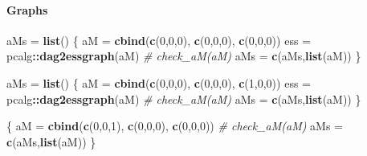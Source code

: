 \documentclass[]{article}
\newenvironment{Shaded}{\begin{snugshade}}{\end{snugshade}}
\newcommand{\KeywordTok}[1]{\textcolor[rgb]{0.13,0.29,0.53}{\textbf{#1}}}
\newcommand{\DecValTok}[1]{\textcolor[rgb]{0.00,0.00,0.81}{#1}}
\newcommand{\StringTok}[1]{\textcolor[rgb]{0.31,0.60,0.02}{#1}}
\newcommand{\CommentTok}[1]{\textcolor[rgb]{0.56,0.35,0.01}{\textit{#1}}}
\newcommand{\OperatorTok}[1]{\textcolor[rgb]{0.81,0.36,0.00}{\textbf{#1}}}
\newcommand{\NormalTok}[1]{#1}
\let\oldparagraph\paragraph
\renewcommand{\paragraph}[1]{\oldparagraph{#1}\mbox{}}
\theoremstyle{definition}
\theoremstyle{definition}
\theoremstyle{definition}
\theoremstyle{remark}
\begin{document}
\paragraph{Graphs}\label{graphs}

\begin{Shaded}
\begin{Highlighting}[]
\NormalTok{aMs =}\StringTok{ }\KeywordTok{list}\NormalTok{()}
\NormalTok{\{}
\NormalTok{  aM =}\StringTok{ }\KeywordTok{cbind}\NormalTok{(}\KeywordTok{c}\NormalTok{(}\DecValTok{0}\NormalTok{,}\DecValTok{0}\NormalTok{,}\DecValTok{0}\NormalTok{),}
             \KeywordTok{c}\NormalTok{(}\DecValTok{0}\NormalTok{,}\DecValTok{0}\NormalTok{,}\DecValTok{0}\NormalTok{),}
             \KeywordTok{c}\NormalTok{(}\DecValTok{0}\NormalTok{,}\DecValTok{0}\NormalTok{,}\DecValTok{0}\NormalTok{))}
\NormalTok{  ess =}\StringTok{ }\NormalTok{pcalg}\OperatorTok{::}\KeywordTok{dag2essgraph}\NormalTok{(aM)}
  \CommentTok{# check_aM(aM)}
\NormalTok{  aMs =}\StringTok{ }\KeywordTok{c}\NormalTok{(aMs,}\KeywordTok{list}\NormalTok{(aM))}
\NormalTok{\}}
\end{Highlighting}
\end{Shaded}

\begin{Shaded}
\begin{Highlighting}[]
\NormalTok{aMs =}\StringTok{ }\KeywordTok{list}\NormalTok{()}
\NormalTok{\{}
\NormalTok{  aM =}\StringTok{ }\KeywordTok{cbind}\NormalTok{(}\KeywordTok{c}\NormalTok{(}\DecValTok{0}\NormalTok{,}\DecValTok{0}\NormalTok{,}\DecValTok{0}\NormalTok{),}
             \KeywordTok{c}\NormalTok{(}\DecValTok{0}\NormalTok{,}\DecValTok{0}\NormalTok{,}\DecValTok{0}\NormalTok{),}
             \KeywordTok{c}\NormalTok{(}\DecValTok{1}\NormalTok{,}\DecValTok{0}\NormalTok{,}\DecValTok{0}\NormalTok{))}
\NormalTok{  ess =}\StringTok{ }\NormalTok{pcalg}\OperatorTok{::}\KeywordTok{dag2essgraph}\NormalTok{(aM)}
  \CommentTok{# check_aM(aM)}
\NormalTok{  aMs =}\StringTok{ }\KeywordTok{c}\NormalTok{(aMs,}\KeywordTok{list}\NormalTok{(aM))}
\NormalTok{\}}

\NormalTok{\{}
\NormalTok{  aM =}\StringTok{ }\KeywordTok{cbind}\NormalTok{(}\KeywordTok{c}\NormalTok{(}\DecValTok{0}\NormalTok{,}\DecValTok{0}\NormalTok{,}\DecValTok{1}\NormalTok{),}
             \KeywordTok{c}\NormalTok{(}\DecValTok{0}\NormalTok{,}\DecValTok{0}\NormalTok{,}\DecValTok{0}\NormalTok{),}
             \KeywordTok{c}\NormalTok{(}\DecValTok{0}\NormalTok{,}\DecValTok{0}\NormalTok{,}\DecValTok{0}\NormalTok{))}
  \CommentTok{# check_aM(aM)}
\NormalTok{  aMs =}\StringTok{ }\KeywordTok{c}\NormalTok{(aMs,}\KeywordTok{list}\NormalTok{(aM))}
\NormalTok{\}}
\end{Highlighting}
\end{Shaded}
\end{document}
